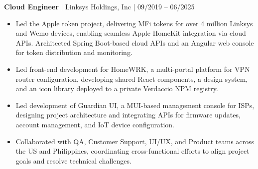 \textbf{Cloud Engineer} | Linksys Holdings, Inc | 09/2019 -- 06/2025
\begin{itemize}
  \item Led the Apple token project, delivering MFi tokens for over 4 million Linksys and Wemo devices, enabling seamless Apple HomeKit integration via cloud APIs. Architected Spring Boot-based cloud APIs and an Angular web console for token distribution and monitoring.
  \item Led front-end development for HomeWRK, a multi-portal platform for VPN router configuration, developing shared React components, a design system, and an icon library deployed to a private Verdaccio NPM registry.
  \item Led development of Guardian UI, a MUI-based management console for ISPs, designing project architecture and integrating APIs for firmware updates, account management, and IoT device configuration.
  \item Collaborated with QA, Customer Support, UI/UX, and Product teams across the US and Philippines, coordinating cross-functional efforts to align project goals and resolve technical challenges.
\end{itemize}
